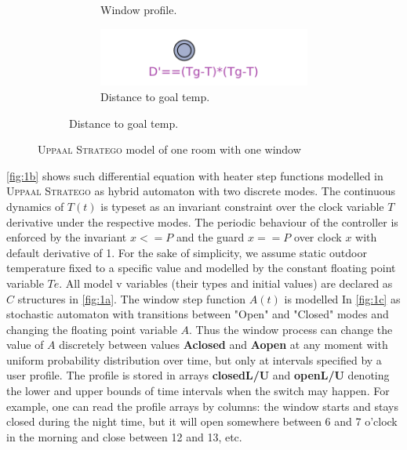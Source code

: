 \begin{figure}[!htb]
\begin{subfigure}{0.35\textwidth}
\begin{subfigure}{\textwidth}
            \caption{Window profile.} \label{fig:1c}
          \end{subfigure}
          \begin{subfigure}{\textwidth}
            \includegraphics[width=\linewidth]{images/distancetogoal.png}
            \caption{Distance to goal temp.} \label{fig:1d}
          \end{subfigure}     

      \end{subfigure}
      
      \caption{\textsc{Uppaal Stratego} model of one room with one window}
    \end{figure}

    \autoref{fig:1b} shows such differential equation with heater step functions 
    modelled in \textsc{Uppaal Stratego} as hybrid automaton with two discrete 
    modes. The continuous dynamics of $T(t)$ is typeset as an invariant constraint over the 
    clock variable $T$ derivative under the respective modes. The periodic 
    behaviour of the controller is enforced by the invariant $x<=P$ and the guard $x==P$
    over clock $x$ with default derivative of 1. For the sake of simplicity,
    we assume static outdoor temperature fixed to a specific value and 
    modelled by the constant floating point variable $Te$. All model v
    variables (their types and initial values) are declared as $C$ structures
    in \autoref{fig:1a}. The window step function $A(t)$ is modelled In
    \autoref{fig:1c} as stochastic automaton with transitions between "Open"
    and "Closed" modes and changing the floating point variable $A$. Thus
    the window process can change the value of $A$ discretely between values
    \textbf{Aclosed} and \textbf{Aopen} at any moment with uniform probability 
    distribution over time, but only at intervals specified by a user 
    profile. The profile is stored in arrays \textbf{closedL/U} and \textbf{openL/U}
    denoting the lower and upper bounds of time intervals when the switch 
    may happen. For example, one can read the profile arrays by columns:
    the window starts and stays closed during the night time, but it will 
    open somewhere between 6 and 7 o'clock in the morning and close between
    12 and 13, etc. 

